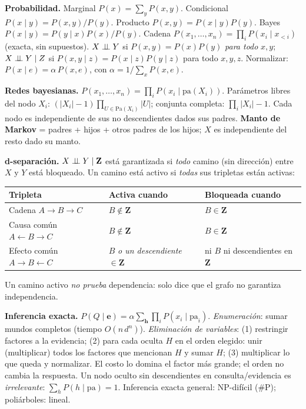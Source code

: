 \begin{formulario}
\textbf{Probabilidad.} Marginal $P(x)=\sum_yP(x,y)$. Condicional $P(x\mid y)=P(x,y)/P(y)$.
Producto $P(x,y)=P(x\mid y)P(y)$. Bayes $P(x\mid y)=P(y\mid x)P(x)/P(y)$.
Cadena $P(x_1,\dots,x_n)=\prod_iP(x_i\mid x_{<i})$ (exacta, sin supuestos).
$X\perp\!\!\!\perp Y$ si $P(x,y)=P(x)P(y)$ \emph{para todo} $x,y$; $X\perp\!\!\!\perp Y\mid Z$ si $P(x,y\mid z)=P(x\mid z)P(y\mid z)$ para todo $x,y,z$.
Normalizar: $P(x\mid e)=\alpha\,P(x,e)$, con $\alpha=1/\sum_xP(x,e)$.
\end{formulario}

\begin{formulario}
\textbf{Redes bayesianas.} $P(x_1,\dots,x_n)=\prod_iP(x_i\mid\mathrm{pa}(X_i))$.
Parámetros libres del nodo $X_i$: $(|X_i|-1)\prod_{U\in\mathrm{Pa}(X_i)}|U|$; conjunta completa: $\prod_i|X_i|-1$.
Cada nodo es independiente de sus no descendientes dados sus padres.
\textbf{Manto de Markov} = padres + hijos + otros padres de los hijos; $X$ es independiente del resto dado su manto.

\smallskip
\textbf{d-separación.} $X\perp\!\!\!\perp Y\mid\mathbf Z$ está garantizada si \emph{todo} camino (sin dirección) entre $X$ y $Y$ está bloqueado.
Un camino está activo si \emph{todas} sus tripletas están activas:
\begin{center}\small
\begin{tabular}{lll}
\toprule
Tripleta & Activa cuando & Bloqueada cuando\\\midrule
Cadena $A\to B\to C$ & $B\notin\mathbf Z$ & $B\in\mathbf Z$\\
Causa común $A\leftarrow B\to C$ & $B\notin\mathbf Z$ & $B\in\mathbf Z$\\
Efecto común $A\to B\leftarrow C$ & $B$ \emph{o un descendiente} $\in\mathbf Z$ & ni $B$ ni descendientes en $\mathbf Z$\\\bottomrule
\end{tabular}
\end{center}
Un camino activo \emph{no prueba} dependencia: solo dice que el grafo no garantiza independencia.
\end{formulario}

\begin{formulario}
\textbf{Inferencia exacta.} $P(Q\mid\mathbf e)=\alpha\sum_{\mathbf h}\prod_iP(x_i\mid\mathrm{pa}_i)$.
\emph{Enumeración}: sumar mundos completos (tiempo $O(n\,d^n)$).
\emph{Eliminación de variables}: (1) restringir factores a la evidencia; (2) para cada oculta $H$ en el orden elegido:
unir (multiplicar) todos los factores que mencionan $H$ y sumar $H$; (3) multiplicar lo que queda y normalizar.
El costo lo domina el factor más grande; el orden no cambia la respuesta. Un nodo oculto sin
descendientes en consulta/evidencia es \emph{irrelevante}: $\sum_hP(h\mid\mathrm{pa})=1$.
Inferencia exacta general: NP-difícil (\#P); poliárboles: lineal.
\end{formulario}


